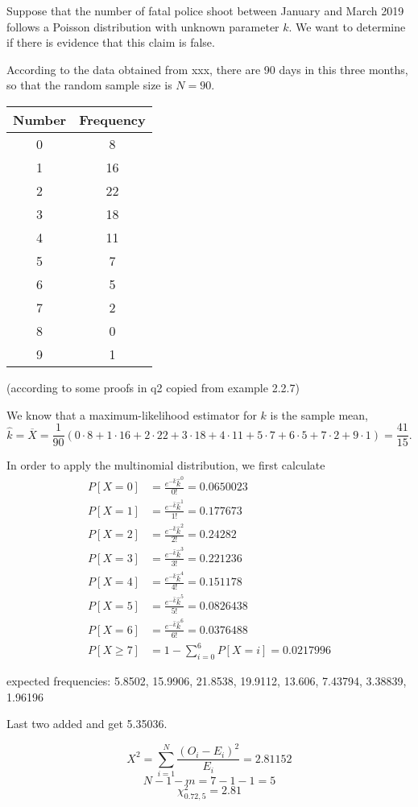 \documentclass[conf]{new-aiaa}
\begin{document}
Suppose that the number of fatal police shoot between January and March 2019 follows a Poisson distribution with unknown parameter $k$. We want
to determine if there is evidence that this claim is false.

According to the data obtained from xxx, there are 90 days in this three months, so that the random sample size is $N=90$.

\begin{tabular}{cc}
Number & Frequency \\\hline
0 & 8 \\
1 & 16 \\
2 & 22 \\
3 & 18 \\
4 & 11 \\
5 & 7 \\
6 & 5 \\
7 & 2 \\
8 & 0 \\
9 & 1 
\end{tabular}

(according to some proofs in q2 copied from example 2.2.7)

We know that a maximum-likelihood estimator for $k$ is the sample mean,
$$\hat{k}=\overline{X}=\frac{1}{90}
(0\cdot8+1\cdot16+2\cdot22+3\cdot18+4\cdot11
+5\cdot7+6\cdot5+7\cdot2+9\cdot1)=\frac{41}{15}.$$

In order to apply the multinomial distribution, we first calculate
\begin{align*}
P[X=0]&=\frac{e^{-\hat{k}}\hat{k}^0}{0!}=0.0650023\\
P[X=1]&=\frac{e^{-\hat{k}}\hat{k}^1}{1!}=0.177673\\
P[X=2]&=\frac{e^{-\hat{k}}\hat{k}^2}{2!}=0.24282\\
P[X=3]&=\frac{e^{-\hat{k}}\hat{k}^3}{3!}=0.221236\\
P[X=4]&=\frac{e^{-\hat{k}}\hat{k}^4}{4!}=0.151178\\
P[X=5]&=\frac{e^{-\hat{k}}\hat{k}^5}{5!}=0.0826438\\
P[X=6]&=\frac{e^{-\hat{k}}\hat{k}^6}{6!}=0.0376488\\
P[X\geqslant7]&=1-\sum_{i=0}^6P[X=i]=0.0217996
\end{align*}

expected frequencies:
5.8502, 15.9906, 21.8538, 19.9112, 13.606, 7.43794, 3.38839, 1.96196

Last two added and get 5.35036.

$$X^2=\sum_{i=1}^N\frac{(O_i-E_i)^2}{E_i}=2.81152$$
$$N-1-m=7-1-1=5$$
$$\chi^2_{0.72,5}=2.81$$
\end{document}
